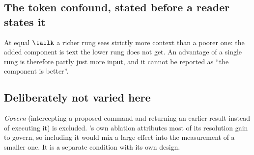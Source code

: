 
\subsection{The token confound, stated before a reader states it}

At equal $\tailk$ a richer rung sees strictly more context than a poorer
one: the added component is text the lower rung does not get. An advantage
of a single rung is therefore partly just more input, and it cannot be
reported as ``the component is better''.


\subsection{Deliberately not varied here}

\emph{Govern} (intercepting a proposed command and returning an earlier
result instead of executing it) is excluded. \Ledger{}'s own ablation
attributes most of its resolution gain to govern\origin, so including it
would mix a large effect into the measurement of a smaller one. It is a
separate condition with its own design.
